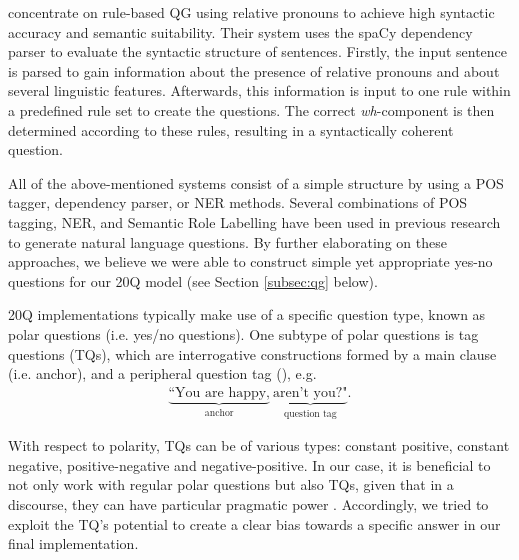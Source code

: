 \documentclass[11pt,a4paper]{article}
\begin{document}
\citet{KhullarEa2018} concentrate on rule-based QG using relative pronouns to achieve high syntactic accuracy and semantic suitability. 
Their system uses the spaCy dependency parser to evaluate the syntactic structure of sentences. 
Firstly, the input sentence is parsed to gain information about the presence of relative pronouns and about several linguistic features. 
Afterwards, this information is input to one rule within a predefined rule set to create the questions. 
The correct \textit{wh}-component is then determined according to these rules, resulting in a syntactically coherent question. 

All of the above-mentioned systems consist of a simple structure by using a POS tagger, dependency parser, or NER methods. 
Several combinations of POS tagging, NER, and Semantic Role Labelling have been used in previous research to generate natural language questions. 
By further elaborating on these approaches, we believe we were able to construct simple yet appropriate yes-no questions for our 20Q model (see Section \ref{subsec:qg} below). 


20Q implementations typically make use of a specific question type, known as polar questions (i.e. yes/no questions). One subtype of polar questions is tag questions (TQs), which are interrogative constructions formed by a main clause (i.e. anchor), and a peripheral question tag (\citealt{Bawden2017, Bonsignori2007,TottieEa2006}), e.g. 
\begin{gather*}
    \underbrace{\text{``You are happy,}}_{\text{anchor}}\ \underbrace{\text{aren't you?"}}_{\text{question tag}}. 
\end{gather*}

With respect to polarity, TQs can be of various types: constant positive, constant negative, positive-negative and negative-positive. In our case, it is beneficial to not only work with regular polar questions but also TQs, given that in a discourse, they can have particular pragmatic power \citep{TottieEa2006}. Accordingly, we tried to exploit the TQ’s potential to create a clear bias towards a specific answer in our final implementation. 

\end{document}
